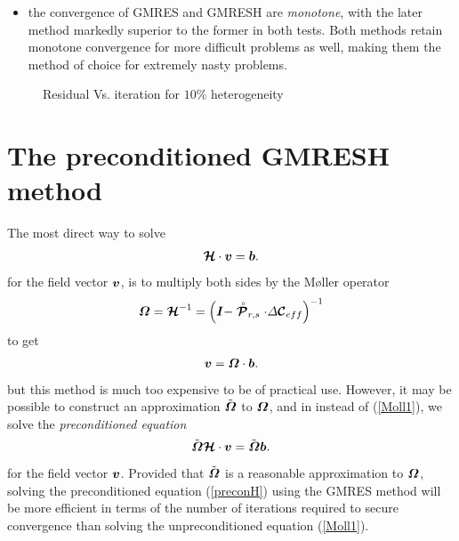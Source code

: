 \begin{itemize}
\item the convergence of  GMRES and GMRESH are {\em monotone}, with the 
later method markedly superior to the former in both tests.
Both  methods retain 
monotone convergence for more difficult problems as well, making 
them the method of choice for extremely nasty problems.

\end{itemize}


\begin{figure}
\HideDisplacementBoxes
\centerline{}
\caption{Residual Vs. iteration for $10\%$ heterogeneity}
\protect\label{it10error}
\end{figure}


\section{The  preconditioned GMRESH method}
The most direct way to solve
\begin{equation} \label{primal1}
{\mbox{\boldmath$\cal H$\unboldmath}}\cdot{\mbox{\boldmath$\mit v$\unboldmath}}={\mbox{\boldmath$\mit b$\unboldmath}}. 
\end{equation}
for the field vector ${\mbox{\boldmath$\mit v$\unboldmath}}$, is to multiply both sides by the 
M{\o}ller operator 
\begin{equation} \label{Moll1}
{\mbox{\boldmath$\mit \Omega$\unboldmath}}={\mbox{\boldmath$\cal H$\unboldmath}}^{-1}=\left( {\mbox{\boldmath$\mit I$\unboldmath}} - \stackrel{\scriptscriptstyle _{\,\,\circ}}{ \mbox{\boldmath$\cal P$\unboldmath}}_{r,s}\cdot {\mit 
\Delta}{\mbox{\boldmath$\cal C$\unboldmath}}_{eff}   \right)^{-1}
\end{equation}
 to get
\begin{equation} \label{primal2}
{\mbox{\boldmath$\mit v$\unboldmath}}={\mbox{\boldmath$\mit \Omega$\unboldmath}}\cdot{\mbox{\boldmath$\mit b$\unboldmath}}. 
\end{equation}
but this method is much too expensive to be of practical use. However, 
it may be possible to construct an approximation $\tilde{\mbox{\boldmath$\mit \Omega$\unboldmath}}$ to 
${\mbox{\boldmath$\mit \Omega$\unboldmath}}$, and in instead of (\ref{Moll1}),  we solve the {\em 
preconditioned equation\/}
\begin{equation} \label{preconH}
\tilde{\mbox{\boldmath$\mit \Omega$\unboldmath}}{\mbox{\boldmath$\cal H$\unboldmath}}\cdot{\mbox{\boldmath$\mit v$\unboldmath}}=\tilde{\mbox{\boldmath$\mit \Omega$\unboldmath}}{\mbox{\boldmath$\mit b$\unboldmath}}. 
\end{equation}
for the field vector ${\mbox{\boldmath$\mit v$\unboldmath}}$. Provided that $\tilde{\mbox{\boldmath$\mit \Omega$\unboldmath}}$ is 
a reasonable approximation to ${\mbox{\boldmath$\mit \Omega$\unboldmath}}$, solving the preconditioned 
equation (\ref{preconH}) using the GMRES method will be more efficient 
in terms of the number of iterations required to secure convergence than 
solving 
the unpreconditioned equation (\ref{Moll1}).



